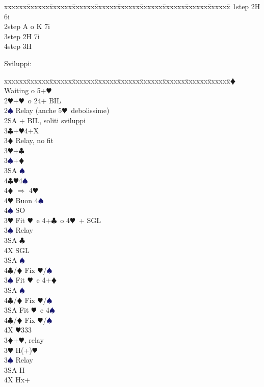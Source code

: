 \documentclass[a4paper,italian]{article}
\newcommand{\BC}{\textcolor{OliveGreen}{$\clubsuit$}}
\newcommand{\BD}{\textcolor{RedOrange}{$\vardiamondsuit$}}
\newcommand{\BH}{\textcolor{Red2}{$\varheartsuit${}}}
\newcommand{\BS}{\textcolor{MidnightBlue}{$\spadesuit${}}}
\newenvironment{bidtable}
{\begin{tabbing}

    xxxxxx\=xxxxxx\=xxxxxx\=xxxxxx\=xxxxxx\=xxxxxx\=xxxxxx\=xxxxxx\=xxxxxx\=xxxxxx\=\kill}
{\end{tabbing} }%
\newenvironment{varie}[1]
{\begin{tcolorbox}[colframe=green!40!black,title=#1]}
    {
\end{tcolorbox} }%
\begin{document}
\begin{multicols}{2}
\begin{varie}{(*) Relay richiesta onori}
        \begin{bidtable}
            1step \> 2H 6i\\
            2step \> A o K 7i\\
            3step \> 2H 7i\\
            4step \> 3H
        \end{bidtable}
    \end{varie}
    Sviluppi:
    \begin{bidtable}
        2\BD \> Waiting o 5+\BH \+\\
        2\BH {}+\BH\ o 24+ BIL\+\\
        2\BS \> Relay (anche 5\BH\ debolissime)\+\\
        2SA + BIL, soliti sviluppi\\
        3\BC {}+\BH4+X \+\\
        3\BD \> Relay, no fit\+\\
        3\BH {}+\BC \\
        3\BS {}+\BD \\
        3SA \BS \\
        4\BC {}\BH 4\BS \+\\
        4\BD \> $\Rightarrow$ 4\BH\\
        4\BH \> Buon 4\BS \\
        4\BS \> SO\-\-\\
        3\BH \> Fit \BH\ e 4+\BC\ o 4\BH\ + SGL\+\\
        3\BS \> Relay\+\\
        3SA \BC \\
        4X \> SGL\-\\
        3SA \BS \+\\
        4\BC/\BD \> Fix \BH/\BS\-\-\\
        3\BS \> Fit \BH\ e 4+\BD \+\\
        3SA \BS \+\\
        4\BC/\BD \> Fix \BH/\BS\-\-\\
        3SA \> Fit \BH\ e 4\BS \+\\
        4\BC/\BD \> Fix \BH/\BS\-\-\\
        4X \BH 333\-\\
        3\BD {}+\BH , relay\+\\
        3\BH \> H(+)\BH \+\\
        3\BS \> Relay\+\\
        3SA \> H\\
        4X \> Hx+\-\-\\

\end{bidtable}
\end{multicols}
\end{document}

